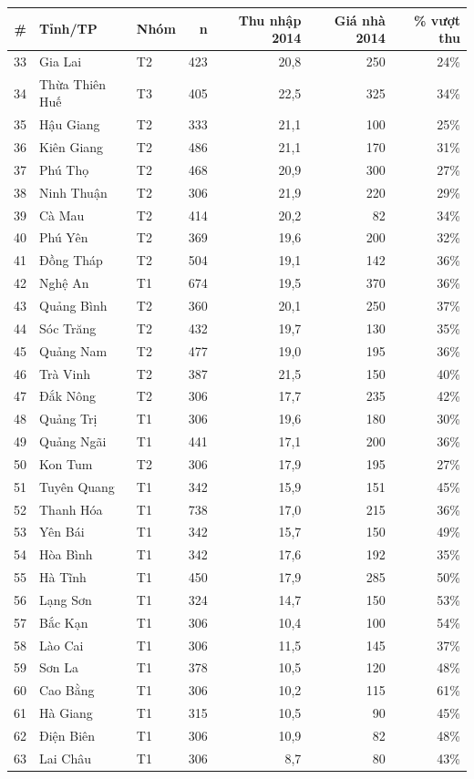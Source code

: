 \begin{tabular}{rllrrrr}
\toprule
\# & Tỉnh/TP & Nhóm & n & Thu nhập 2014 & Giá nhà 2014 & \% vượt thu \\
\midrule
33 & Gia Lai & T2 & 423 & 20,8 & 250 & 24\% \\
34 & Thừa Thiên Huế & T3 & 405 & 22,5 & 325 & 34\% \\
35 & Hậu Giang & T2 & 333 & 21,1 & 100 & 25\% \\
36 & Kiên Giang & T2 & 486 & 21,1 & 170 & 31\% \\
37 & Phú Thọ & T2 & 468 & 20,9 & 300 & 27\% \\
38 & Ninh Thuận & T2 & 306 & 21,9 & 220 & 29\% \\
39 & Cà Mau & T2 & 414 & 20,2 & 82 & 34\% \\
40 & Phú Yên & T2 & 369 & 19,6 & 200 & 32\% \\
41 & Đồng Tháp & T2 & 504 & 19,1 & 142 & 36\% \\
42 & Nghệ An & T1 & 674 & 19,5 & 370 & 36\% \\
43 & Quảng Bình & T2 & 360 & 20,1 & 250 & 37\% \\
44 & Sóc Trăng & T2 & 432 & 19,7 & 130 & 35\% \\
45 & Quảng Nam & T2 & 477 & 19,0 & 195 & 36\% \\
46 & Trà Vinh & T2 & 387 & 21,5 & 150 & 40\% \\
47 & Đắk Nông & T2 & 306 & 17,7 & 235 & 42\% \\
48 & Quảng Trị & T1 & 306 & 19,6 & 180 & 30\% \\
49 & Quảng Ngãi & T1 & 441 & 17,1 & 200 & 36\% \\
50 & Kon Tum & T2 & 306 & 17,9 & 195 & 27\% \\
51 & Tuyên Quang & T1 & 342 & 15,9 & 151 & 45\% \\
52 & Thanh Hóa & T1 & 738 & 17,0 & 215 & 36\% \\
53 & Yên Bái & T1 & 342 & 15,7 & 150 & 49\% \\
54 & Hòa Bình & T1 & 342 & 17,6 & 192 & 35\% \\
55 & Hà Tĩnh & T1 & 450 & 17,9 & 285 & 50\% \\
56 & Lạng Sơn & T1 & 324 & 14,7 & 150 & 53\% \\
57 & Bắc Kạn & T1 & 306 & 10,4 & 100 & 54\% \\
58 & Lào Cai & T1 & 306 & 11,5 & 145 & 37\% \\
59 & Sơn La & T1 & 378 & 10,5 & 120 & 48\% \\
60 & Cao Bằng & T1 & 306 & 10,2 & 115 & 61\% \\
61 & Hà Giang & T1 & 315 & 10,5 & 90 & 45\% \\
62 & Điện Biên & T1 & 306 & 10,9 & 82 & 48\% \\
63 & Lai Châu & T1 & 306 & 8,7 & 80 & 43\% \\
\bottomrule
\end{tabular}
